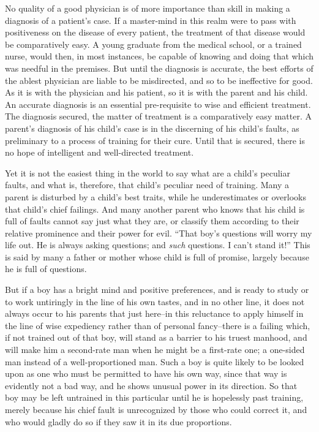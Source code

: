 \documentclass[
]{book}
\begin{document}
No quality of a good physician is of more importance than skill in making a diagnosis of a patient's case. If a master-mind in this realm were to pass with positiveness on the disease of every patient, the treatment of that disease would be comparatively easy. A young graduate from the medical school, or a trained nurse, would then, in most instances, be capable of knowing and doing that which was needful in the premises. But until the diagnosis is accurate, the best efforts of the ablest physician are liable to be misdirected, and so to be ineffective for good. As it is with the physician and his patient, so it is with the parent and his child. An accurate diagnosis is an essential pre-requisite to wise and efficient treatment. The diagnosis secured, the matter of treatment is a comparatively easy matter. A parent's diagnosis of his child's case is in the discerning of his child's faults, as preliminary to a process of training for their cure. Until that is secured, there is no hope of intelligent and well-directed treatment.

Yet it is not the easiest thing in the world to say what are a child's peculiar faults, and what is, therefore, that child's peculiar need of training. Many a parent is disturbed by a child's best traits, while he underestimates or overlooks that child's chief failings. And many another parent who knows that his child is full of faults cannot say just what they are, or classify them according to their relative prominence and their power for evil. ``That boy's questions will worry my life out. He is always asking questions; and \emph{such} questions. I can't stand it!'' This is said by many a father or mother whose child is full of promise, largely because he is full of questions.

But if a boy has a bright mind and positive preferences, and is ready to study or to work untiringly in the line of his own tastes, and in no other line, it does not always occur to his parents that just here--in this reluctance to apply himself in the line of wise expediency rather than of personal fancy--there is a failing which, if not trained out of that boy, will stand as a barrier to his truest manhood, and will make him a second-rate man when he might be a first-rate one; a one-sided man instead of a well-proportioned man. Such a boy is quite likely to be looked upon as one who must be permitted to have his own way, since that way is evidently not a bad way, and he shows unusual power in its direction. So that boy may be left untrained in this particular until he is hopelessly past training, merely because his chief fault is unrecognized by those who could correct it, and who would gladly do so if they saw it in its due proportions.
\end{document}
